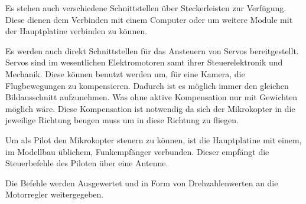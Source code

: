 Es stehen auch verschiedene Schnittstellen über Steckerleisten zur Verfügung.
Diese dienen dem Verbinden mit einem Computer
oder um weitere Module mit der Hauptplatine verbinden zu können.

Es werden auch direkt Schnittstellen für das Ansteuern von Servos bereitgestellt.
Servos sind im wesentlichen Elektromotoren samt ihrer Steuerelektronik
und Mechanik.
Diese können benutzt werden um, für eine Kamera, die Flugbewegungen
zu kompensieren.
Dadurch ist es möglich immer den gleichen Bildausschnitt aufzunehmen.
Was ohne aktive Kompensation nur mit Gewichten möglich wäre.
Diese Kompensation ist notwendig da sich der
Mikrokopter in die jeweilige Richtung beugen muss
um in diese Richtung zu fliegen.

Um als Pilot den Mikrokopter steuern zu können, ist die Hauptplatine mit einem,
im Modellbau üblichem, Funkempfänger verbunden.
Dieser empfängt die Steuerbefehle des Piloten über eine Antenne.

Die Befehle werden Ausgewertet und in Form von Drehzahlenwerten an die
Motorregler weitergegeben.
